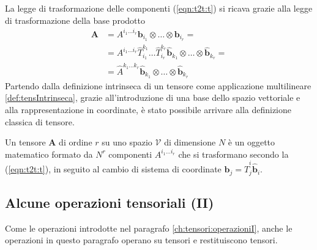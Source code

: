  La legge di trasformazione delle componenti (\ref{eqn:t2t:t}) si ricava grazie alla legge di trasformazione della base prodotto
 \begin{equation}
 \begin{aligned}
  \bm{A} & =  A^{i_1 \dots i_r} \bm{b}_{i_1} \otimes \dots \otimes \bm{b}_{i_r} = \\
   & = A^{i_1 \dots i_r}
     \hat{T}^{k_1}_{i_1}\dots \hat{T}^{k_r}_{i_r} 
     \bm{\hat{b}}_{k_1} \otimes \dots \otimes \bm{\hat{b}}_{k_r} = \\ 
   & = \hat{A}^{k_1 \dots k_r} \bm{\hat{b}}_{k_1} \otimes \dots \otimes \bm{\hat{b}}_{k_r}
 \end{aligned}
 \end{equation}
%
Partendo dalla definizione intrinseca di un tensore come applicazione multilineare \ref{def:tensIntrinseca}, grazie all'introduzione di una base dello spazio vettoriale e alla rappresentazione in coordinate, è stato possibile arrivare alla definizione classica di tensore.
\vspace{15pt}
\begin{definition}
Un tensore $\bm{A}$ di ordine $r$ su uno spazio $\mathcal{V}$ di dimensione $N$ è un oggetto matematico formato da $N^r$ componenti $A^{i_1 \dots i_r}$ che si trasformano secondo la (\ref{eqn:t2t:t}), in seguito al cambio di sistema di coordinate $\bm{b}_j = \hat{T}^i_j \bm{\hat{b}}_i$.
\end{definition}

%
 \subsection{Alcune operazioni tensoriali (II)}\label{ch:tensori:operazioniII}
%
 Come le operazioni introdotte nel paragrafo \ref{ch:tensori:operazioniI}, anche le operazioni in questo paragrafo operano su tensori e restituiscono tensori.
 
